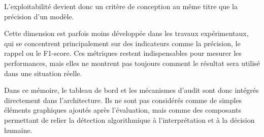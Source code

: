 L'exploitabilité devient donc un critère de conception au même titre que la précision d'un modèle.

Cette dimension est parfois moins développée dans les travaux expérimentaux, qui se concentrent principalement sur des indicateurs comme la précision, le rappel ou le F1-score. Ces métriques restent indispensables pour mesurer les performances, mais elles ne montrent pas toujours comment le résultat sera utilisé dans une situation réelle.

Dans ce mémoire, le tableau de bord et les mécanismes d'audit sont donc intégrés directement dans l'architecture. Ils ne sont pas considérés comme de simples éléments graphiques ajoutés après l'évaluation, mais comme des composants permettant de relier la détection algorithmique à l'interprétation et à la décision humaine.
